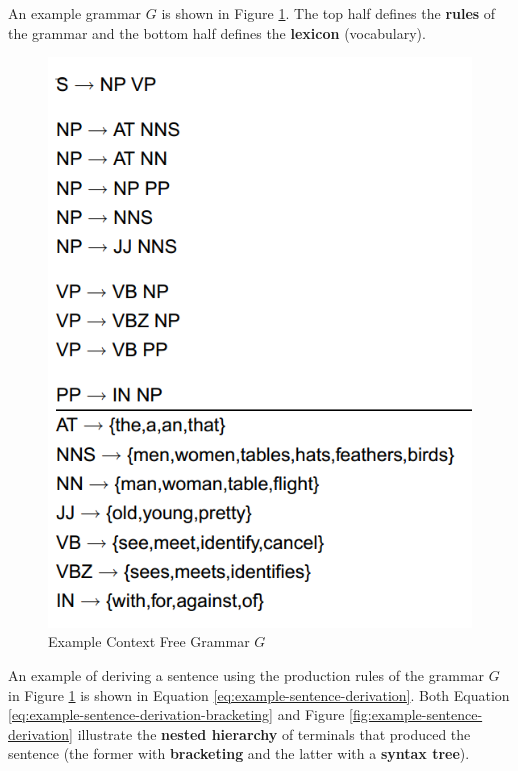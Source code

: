 \documentclass{article}
\begin{document}
An example grammar $G$ is shown in Figure \ref{fig:example-grammar}. The top half defines the \textbf{rules} of the grammar and the bottom half defines the \textbf{lexicon} (vocabulary).

\begin{figure}
	\centering
	\includegraphics[scale=0.4]{figures/example-grammar.png}
	\caption{Example Context Free Grammar $G$}
	\label{fig:example-grammar}
\end{figure}

An example of deriving a sentence using the production rules of the grammar $G$ in Figure \ref{fig:example-grammar} is shown in Equation \ref{eq:example-sentence-derivation}. Both Equation \ref{eq:example-sentence-derivation-bracketing} and Figure \ref{fig:example-sentence-derivation} illustrate the \textbf{nested hierarchy} of terminals that produced the sentence (the former with \textbf{bracketing} and the latter with a \textbf{syntax tree}).
\end{document}
